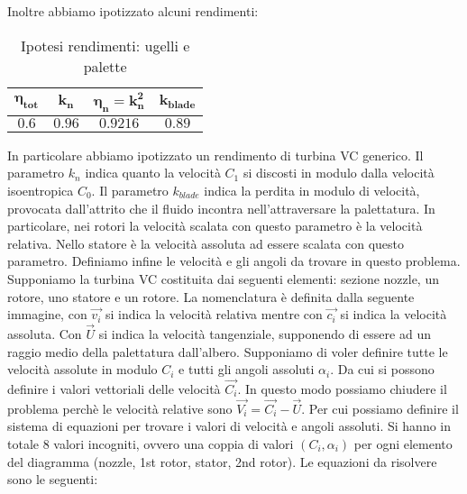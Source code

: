 Inoltre abbiamo ipotizzato alcuni rendimenti:

\begin{table}[H]

\centering
\begin{tabular}{|c|c|c|c|}
\hline
$\bm{\eta_{tot}}$ & $\bm{k_n}$ & $\bm{\eta_n = k_n ^2}$ &  $\bm{k_{blade}}$   \\
\hline
$0.6$ & $0.96$ & $0.9216$ &  $0.89$ \\
\hline
\end{tabular}

\caption{Ipotesi rendimenti: ugelli e palette}
\label{table:rendimenti turbina}
\end{table}


In particolare abbiamo ipotizzato un rendimento di turbina VC generico. Il parametro $k_n$ indica quanto la velocità $C_1$ si discosti in modulo dalla velocità isoentropica $C_0$. Il parametro $k_{blade}$ indica la perdita in modulo di velocità, provocata dall'attrito che il fluido incontra nell'attraversare la palettatura. In particolare, nei rotori la velocità scalata con questo parametro è la velocità relativa. Nello statore è la velocità assoluta ad essere scalata con questo parametro. 
Definiamo infine le velocità e gli angoli da trovare in questo problema. Supponiamo la turbina VC costituita dai seguenti elementi: sezione nozzle, un rotore, uno statore e un rotore. La nomenclatura è definita dalla seguente immagine, con $\vec{v_i}$ si indica la velocità relativa mentre con $\vec{c_i}$ si indica la velocità assoluta. Con $\vec{U}$ si indica la velocità tangenziale, supponendo di essere ad un raggio medio della palettatura dall'albero. Supponiamo di voler definire tutte le velocità assolute in modulo $C_i$ e tutti gli angoli assoluti $\alpha_i$. Da cui si possono definire i valori vettoriali delle velocità $\vec{C_i}$.  In questo modo possiamo chiudere il problema perchè le velocità relative sono $\vec{V_i} = \vec{C_i} - \vec{U}$. Per cui possiamo definire il sistema di equazioni per trovare i valori di velocità e angoli assoluti. Si hanno in totale 8 valori incogniti, ovvero una coppia di valori $\left(C_i, \alpha_i\right)$ per ogni elemento del diagramma (nozzle, 1st rotor, stator, 2nd rotor). Le equazioni da risolvere sono le seguenti:

